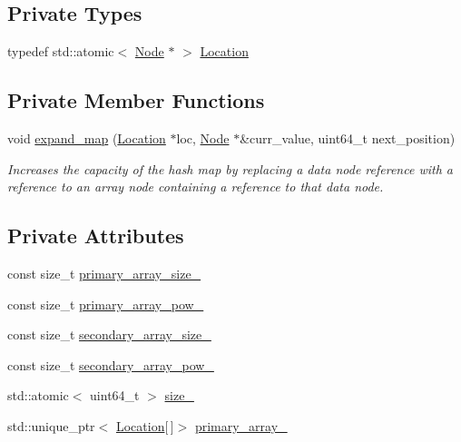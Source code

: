 \subsection*{Private Types}
\begin{DoxyCompactItemize}
\item 
typedef std\+::atomic$<$ \hyperlink{classtervel_1_1containers_1_1wf_1_1_hash_map_no_delete_1_1_node}{Node} $\ast$ $>$ \hyperlink{classtervel_1_1containers_1_1wf_1_1_hash_map_no_delete_af5b18c3806eb5b2d39693075d8c70ade}{Location}
\end{DoxyCompactItemize}
\subsection*{Private Member Functions}
\begin{DoxyCompactItemize}
\item 
void \hyperlink{classtervel_1_1containers_1_1wf_1_1_hash_map_no_delete_a381d5f5ba7c9b8d693d2190a2f075bd0}{expand\+\_\+map} (\hyperlink{classtervel_1_1containers_1_1wf_1_1_hash_map_no_delete_af5b18c3806eb5b2d39693075d8c70ade}{Location} $\ast$loc, \hyperlink{classtervel_1_1containers_1_1wf_1_1_hash_map_no_delete_1_1_node}{Node} $\ast$\&curr\+\_\+value, uint64\+\_\+t next\+\_\+position)
\begin{DoxyCompactList}\small\item\em Increases the capacity of the hash map by replacing a data node reference with a reference to an array node containing a reference to that data node. \end{DoxyCompactList}\end{DoxyCompactItemize}
\subsection*{Private Attributes}
\begin{DoxyCompactItemize}
\item 
const size\+\_\+t \hyperlink{classtervel_1_1containers_1_1wf_1_1_hash_map_no_delete_a1f333a92710074bed29c9f941b06eec7}{primary\+\_\+array\+\_\+size\+\_\+}
\item 
const size\+\_\+t \hyperlink{classtervel_1_1containers_1_1wf_1_1_hash_map_no_delete_ac3431b2c53bed4e88100925683305b7d}{primary\+\_\+array\+\_\+pow\+\_\+}
\item 
const size\+\_\+t \hyperlink{classtervel_1_1containers_1_1wf_1_1_hash_map_no_delete_ab729cf227a5662c6f91b4ead2e8ca7f7}{secondary\+\_\+array\+\_\+size\+\_\+}
\item 
const size\+\_\+t \hyperlink{classtervel_1_1containers_1_1wf_1_1_hash_map_no_delete_a0c80efcf817e89cd28b70549611afdbe}{secondary\+\_\+array\+\_\+pow\+\_\+}
\item 
std\+::atomic$<$ uint64\+\_\+t $>$ \hyperlink{classtervel_1_1containers_1_1wf_1_1_hash_map_no_delete_a48a1191506c1beadd156e234e037126a}{size\+\_\+}
\item 
std\+::unique\+\_\+ptr$<$ \hyperlink{classtervel_1_1containers_1_1wf_1_1_hash_map_no_delete_af5b18c3806eb5b2d39693075d8c70ade}{Location}\mbox{[}$\,$\mbox{]}$>$ \hyperlink{classtervel_1_1containers_1_1wf_1_1_hash_map_no_delete_a28471f701bfecc080dfbc3d109b221ff}{primary\+\_\+array\+\_\+}
\end{DoxyCompactItemize}
